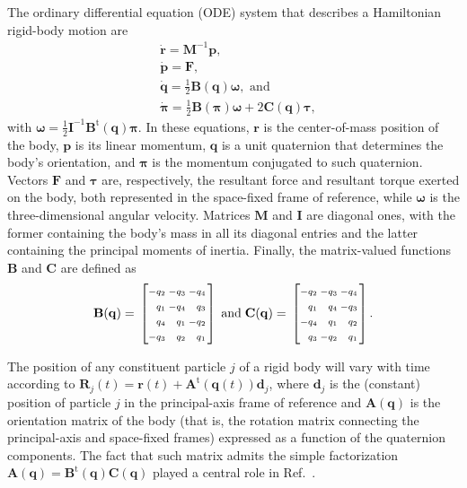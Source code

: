 \documentclass[journal=jctcce,manuscript=article,layout=twocolumn]{achemso}
\makeatletter
\newcommand{\mt}[1]{\boldsymbol{\mathbf{#1}}}   %
\newcommand{\vt}[1]{\boldsymbol{\mathbf{#1}}}   %
\newcommand{\tr}[1]{#1^\text{t}}                %
\newcommand{\diff}[2]{\frac{\partial #1}{\partial #2}} %
\newcommand{\Ham}[1]{{\mathcal H}_\text{#1}}    %
\newenvironment{smallarray}[1]                          %
{\null\,\vcenter\bgroup\scriptsize
	\renewcommand{\arraystretch}{1.5}
	\arraycolsep=.13885em
	\hbox\bgroup$\left[\array{@{}#1@{}}}
{\endarray\right]$\egroup\egroup\,\null}
\makeatother
\begin{document}
The ordinary differential equation (ODE) system that describes a Hamiltonian rigid-body motion are \cite{Silveira_2017}
\begin{subequations}
	\label{eq:ODE system for NVE}
	\begin{align}
%
	&\dot{\vt r} =
	{\mt M}^{-1} {\vt p}, \\
%
	&\dot{\vt p} =
	{\vt F}, \\
%
	&\dot{\vt q} =
	\frac{1}{2} \mt B(\vt q) \vt \omega, \text{ and} \label{eq:EDO_q} \\
%
	&\dot{\vt \pi} =
	\frac{1}{2} \mt B(\vt \pi) \vt \omega + 2 \mt C(\vt q) \vt \tau, \label{eq:EDO_pi}
	\end{align}
\end{subequations}
with $\vt \omega = \frac{1}{2} {\mt I}^{-1} \tr{\mt B}(\vt q) {\vt \pi}$. In these equations, $\vt r$ is the center-of-mass position of the body, $\vt p$ is its linear momentum, $\vt q$ is a unit quaternion that determines the body's orientation, and $\vt \pi$ is the momentum conjugated to such quaternion. Vectors $\vt F$ and $\vt \tau$ are, respectively, the resultant force and resultant torque exerted on the body, both represented in the space-fixed frame of reference, while $\vt \omega$ is the three-dimensional angular velocity. Matrices $\mt M$ and $\mt I$ are diagonal ones, with the former containing the body's mass in all its diagonal entries and the latter containing the principal moments of inertia. Finally, the matrix-valued functions $\mt B$ and $\vt C$ are defined as
\begin{equation*}
\label{eq:def_B_and_C}
\mt B(\vt q) = \begin{smallarray}{rrrr}
-q_2 & -q_3 & -q_4 \\
 q_1 & -q_4 &  q_3 \\
 q_4 &  q_1 & -q_2 \\
-q_3 &  q_2 &  q_1
\end{smallarray}
\; \text{and} \;
\mt C(\vt q) = \begin{smallarray}{rrrr}
-q_2 & -q_3 & -q_4 \\
 q_1 &  q_4 & -q_3 \\
-q_4 &  q_1 &  q_2 \\
 q_3 & -q_2 &  q_1
\end{smallarray}.
\end{equation*}

The position of any constituent particle $j$ of a rigid body will vary with time according to $\vt R_j(t) = \vt r(t) + \tr{\mt A}(\vt q(t))\vt d_j$, where $\vt d_j$ is the (constant) position of particle $j$ in the principal-axis frame of reference and ${\mt A}(\vt q)$ is the orientation matrix of the body (that is, the rotation matrix connecting the principal-axis and space-fixed frames) expressed as a function of the quaternion components. The fact that such matrix admits the simple factorization ${\mt A}(\vt q) = \tr{\mt B}(\vt q) {\mt C}(\vt q)$ played a central role in Ref.~.
\end{document}
